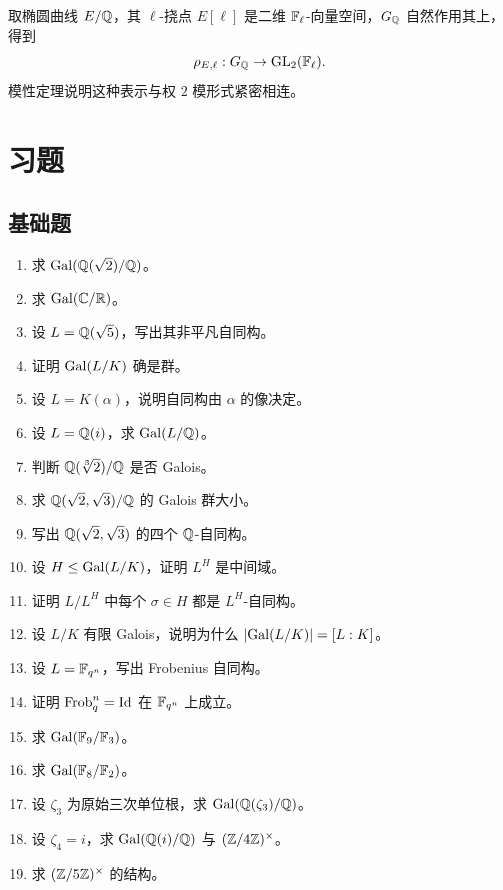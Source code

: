 \begin{example}
取椭圆曲线 $E/\mathbb{Q}$，其 $\ell$-挠点 $E[\ell]$ 是二维 $\mathbb{F}_\ell$-向量空间，$G_{\mathbb{Q}}$ 自然作用其上，得到
\[
 \rho_{E,\ell}:G_{\mathbb{Q}}\to \mathrm{GL}_2(\mathbb{F}_\ell).
\]
模性定理说明这种表示与权 $2$ 模形式紧密相连。
\end{example}

\section*{习题}

\subsection*{基础题}
\begin{enumerate}[label=\textbf{\arabic*.}, leftmargin=*, itemsep=0.5em]
\item \basic 求 $\mathrm{Gal}(\mathbb{Q}(\sqrt2)/\mathbb{Q})$。
\item \basic 求 $\mathrm{Gal}(\mathbb{C}/\mathbb{R})$。
\item \basic 设 $L=\mathbb{Q}(\sqrt5)$，写出其非平凡自同构。
\item \basic 证明 $\mathrm{Gal}(L/K)$ 确是群。
\item \basic 设 $L=K(\alpha)$，说明自同构由 $\alpha$ 的像决定。
\item \basic 设 $L=\mathbb{Q}(i)$，求 $\mathrm{Gal}(L/\mathbb{Q})$。
\item \basic 判断 $\mathbb{Q}(\sqrt[3]{2})/\mathbb{Q}$ 是否 Galois。
\item \basic 求 $\mathbb{Q}(\sqrt2,\sqrt3)/\mathbb{Q}$ 的 Galois 群大小。
\item \basic 写出 $\mathbb{Q}(\sqrt2,\sqrt3)$ 的四个 $\mathbb{Q}$-自同构。
\item \basic 设 $H\le \mathrm{Gal}(L/K)$，证明 $L^H$ 是中间域。
\item \basic 证明 $L/L^H$ 中每个 $\sigma\in H$ 都是 $L^H$-自同构。
\item \basic 设 $L/K$ 有限 Galois，说明为什么 $|\mathrm{Gal}(L/K)|=[L:K]$。
\item \basic 设 $L=\mathbb{F}_{q^n}$，写出 Frobenius 自同构。
\item \basic 证明 $\mathrm{Frob}_q^n=\mathrm{Id}$ 在 $\mathbb{F}_{q^n}$ 上成立。
\item \basic 求 $\mathrm{Gal}(\mathbb{F}_{9}/\mathbb{F}_3)$。
\item \basic 求 $\mathrm{Gal}(\mathbb{F}_{8}/\mathbb{F}_2)$。
\item \basic 设 $\zeta_3$ 为原始三次单位根，求 $\mathrm{Gal}(\mathbb{Q}(\zeta_3)/\mathbb{Q})$。
\item \basic 设 $\zeta_4=i$，求 $\mathrm{Gal}(\mathbb{Q}(i)/\mathbb{Q})$ 与 $(\mathbb{Z}/4\mathbb{Z})^\times$。
\item \basic 求 $(\mathbb{Z}/5\mathbb{Z})^\times$ 的结构。

\end{enumerate}
